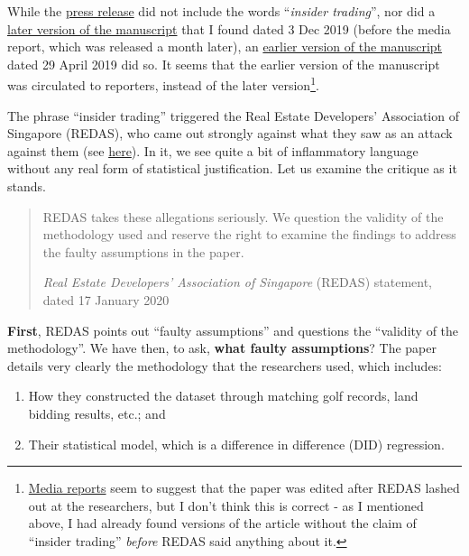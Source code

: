 \documentclass[openany]{book}
\providecommand{\tightlist}{%
  \setlength{\itemsep}{0pt}\setlength{\parskip}{0pt}}
\let\rmarkdownfootnote\footnote%
\def\footnote{\protect\rmarkdownfootnote}
\begin{document}
While the
\href{https://bschool.nus.edu.sg/media/press-release-details/636/}{press
release} did not include the words ``\emph{insider trading}'', nor did a
\href{https://www.arx.cfa/-/media/regional/arx/post-pdf/2019/12/24/afbc-2019-golfing-for-information.ashx}{later
version of the manuscript} that I found dated 3 Dec 2019 (before the
media report, which was released a month later), an
\href{https://editorialexpress.com/cgi-bin/conference/download.cgi?db_name=AFAPS2020\&paper_id=234}{earlier
version of the manuscript} dated 29 April 2019 did so. It seems that the
earlier version of the manuscript was circulated to reporters, instead
of the later version\footnote{\href{https://www.todayonline.com/singapore/nus-researchers-drop-claim-insider-trading-among-real-estate-executives-golf-course}{Media
  reports} seem to suggest that the paper was edited after REDAS lashed
  out at the researchers, but I don't think this is correct - as I
  mentioned above, I had already found versions of the article without
  the claim of ``insider trading'' \emph{before} REDAS said anything
  about it.}.

The phrase ``insider trading'' triggered the Real Estate Developers'
Association of Singapore (REDAS), who came out strongly against what
they saw as an attack against them (see
\href{https://www.redas.com/assets/files/press\%20release/2019/REDAS_Response_NUS_Study_on_Link.pdf}{here}).
In it, we see quite a bit of inflammatory language without any real form
of statistical justification. Let us examine the critique as it stands.

\begin{quote}
REDAS takes these allegations seriously. We question the validity of the
methodology used and reserve the right to examine the findings to
address the faulty assumptions in the paper.

\emph{Real Estate Developers' Association of Singapore} (REDAS)
statement, dated 17 January 2020
\end{quote}

\textbf{First}, REDAS points out ``faulty assumptions'' and questions
the ``validity of the methodology''. We have then, to ask, \textbf{what
faulty assumptions}? The paper details very clearly the methodology that
the researchers used, which includes:

\begin{enumerate}
\def\labelenumi{\arabic{enumi}.}
\tightlist
\item
  How they constructed the dataset through matching golf records, land
  bidding results, etc.; and
\item
  Their statistical model, which is a difference in difference (DID)
  regression.
\end{enumerate}
\end{document}
